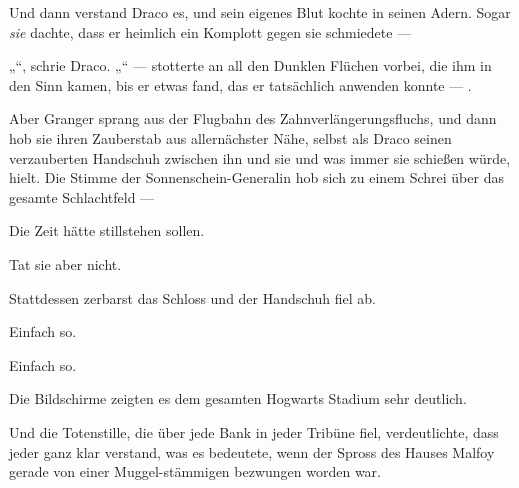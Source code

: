Und dann verstand Draco es, und sein eigenes Blut kochte in seinen Adern. Sogar \emph{sie} dachte, dass er heimlich ein Komplott gegen sie schmiedete —

„“, schrie Draco.
„“ — stotterte an all den Dunklen Flüchen vorbei, die ihm in den Sinn kamen, bis er etwas fand, das er tatsächlich anwenden konnte — .

Aber Granger sprang aus der Flugbahn des Zahnverlängerungsfluchs, und dann hob sie ihren Zauberstab aus allernächster Nähe, selbst als Draco seinen verzauberten Handschuh zwischen ihn und sie und was immer sie schießen würde, hielt. Die Stimme der Sonnenschein-Generalin hob sich zu einem Schrei über das gesamte Schlachtfeld —


Die Zeit hätte stillstehen sollen.

Tat sie aber nicht.

Stattdessen zerbarst das Schloss und der Handschuh fiel ab.

Einfach so.

Einfach so.

Die Bildschirme zeigten es dem gesamten Hogwarts Stadium sehr deutlich.

Und die Totenstille, die über jede Bank in jeder Tribüne fiel, verdeutlichte, dass jeder ganz klar verstand, was es bedeutete, wenn der Spross des Hauses Malfoy gerade von einer Muggel-stämmigen bezwungen worden war.

